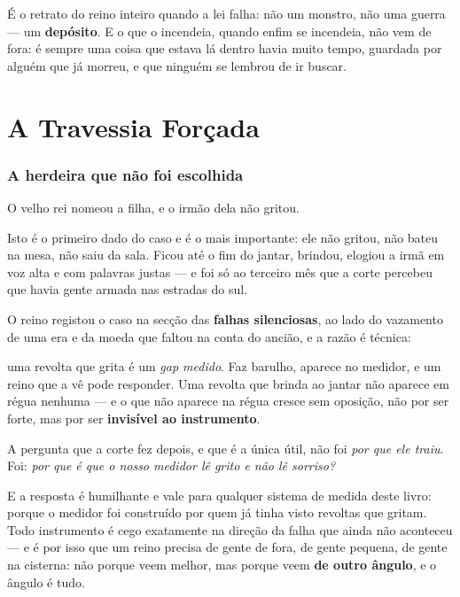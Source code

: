 \documentclass[livro.tex]{subfiles}
\begin{document}
É o retrato do reino inteiro quando a lei falha: não um monstro, não uma guerra --- um
\textbf{depósito}. E o que o incendeia, quando enfim se incendeia, não vem de fora: é
sempre uma coisa que estava lá dentro havia muito tempo, guardada por alguém que já
morreu, e que ninguém se lembrou de ir buscar.


\part{A Travessia Forçada}

\section{A herdeira que não foi escolhida}

O velho rei nomeou a filha, e o irmão dela não gritou.

Isto é o primeiro dado do caso e é o mais importante: ele não gritou, não bateu na mesa,
não saiu da sala. Ficou até o fim do jantar, brindou, elogiou a irmã em voz alta e com
palavras justas --- e foi só ao terceiro mês que a corte percebeu que havia gente armada
nas estradas do sul.

\medskip

O reino registou o caso na secção das \textbf{falhas silenciosas}, ao lado do vazamento de
uma era e da moeda que faltou na conta do ancião, e a razão é técnica:

uma revolta que grita é um \emph{gap medido}. Faz barulho, aparece no medidor, e um reino
que a vê pode responder. Uma revolta que brinda ao jantar não aparece em régua nenhuma ---
e o que não aparece na régua cresce sem oposição, não por ser forte, mas por ser
\textbf{invisível ao instrumento}.

A pergunta que a corte fez depois, e que é a única útil, não foi \emph{por que ele
traiu}. Foi: \emph{por que é que o nosso medidor lê grito e não lê sorriso?}

\medskip

E a resposta é humilhante e vale para qualquer sistema de medida deste livro: porque o
medidor foi construído por quem já tinha visto revoltas que gritam. Todo instrumento é
cego exatamente na direção da falha que ainda não aconteceu --- e é por isso que um reino
precisa de gente de fora, de gente pequena, de gente na cisterna: não porque veem melhor,
mas porque veem \textbf{de outro ângulo}, e o ângulo é tudo.
\end{document}
